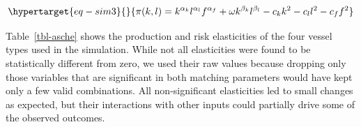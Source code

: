 \documentclass[
  letterpaper,
  DIV=11,
  numbers=noendperiod]{scrartcl}
\theoremstyle{plain}
\theoremstyle{plain}
\theoremstyle{remark}
\begin{document}
\begin{equation}\protect\hypertarget{eq-sim3}{}{
\pi(k,l)=k^{\alpha_k}l^{\alpha_l}f^{\alpha_f}+\omega k^{\beta_k}l^{\beta_l}-c_kk^2-c_ll^2-c_ff^2
}\label{eq-sim3}\end{equation}

Table~\ref{tbl-asche} shows the production and risk elasticities of the
four vessel types used in the simulation. While not all elasticities
were found to be statistically different from zero, we used their raw
values because dropping only those variables that are significant in
both matching parameters would have kept only a few valid combinations.
All non-significant elasticities led to small changes as expected, but
their interactions with other inputs could partially drive some of the
observed outcomes.

\hypertarget{tbl-asche}{}
\end{document}
